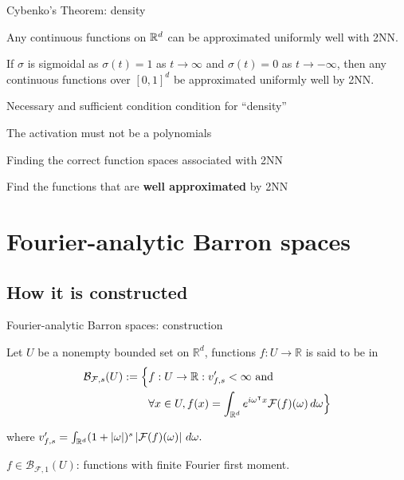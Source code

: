 \documentclass[aspectratio=32]{beamer}
\begin{document}
\begin{frame}{Cybenko's Theorem: density}

    Any continuous functions on $\mathbb{R}^d$ can be approximated uniformly well with
    2NN. 

    \begin{theorem}
    If $\sigma$ is sigmoidal as $\sigma(t)=1$ as $t \to \infty$ and
    $\sigma(t)=0$ as $t \to -\infty$, then any continuous functions over
    $[0,1]^d $ be approximated uniformly well by 2NN.
    \end{theorem}

    Necessary and sufficient condition condition for ``density''

    The activation must not be a polynomials
    \citep{leshnoMultilayerFeedforwardNetworks1993}
\end{frame}

\begin{frame}{Finding the correct function spaces associated with 2NN}

    \begin{center}
        {
            Find the functions that are \textbf{well approximated} by 2NN
        }
    \end{center}

\end{frame}

\section{Fourier-analytic Barron spaces}

\subsection{How it is constructed}

\begin{frame}{Fourier-analytic Barron spaces: construction}
    
    Let $U$ be a nonempty bounded set on $\mathbb{R}^d$, functions $f: U \to
    \mathbb{R}$ is said to be in
    \begin{align*}
        \mathcal{B}_{\mathcal{F},s}(U) := \Big\{
            &f: U \to \mathbb{R}: v'_{f,s} < \infty  \textnormal{ and } \\
            &\forall x\in U, 
                f(x) = \int_{\mathbb{R}^d} e^{i\omega{}^{\intercal} x} \mathcal{F}(f)(\omega)\,d\omega
        \Big\}
    \end{align*}

    where $v'_{f,s} = \int_{\mathbb{R}^d} (1 + \left| \omega \right|)^s
    \left| \mathcal{F}(f)(\omega) \right| \,d\omega.$

    $f \in \mathcal{B}_{\mathcal{F},1}(U)$: functions with finite Fourier first
    moment.
\end{frame}
\end{document}
